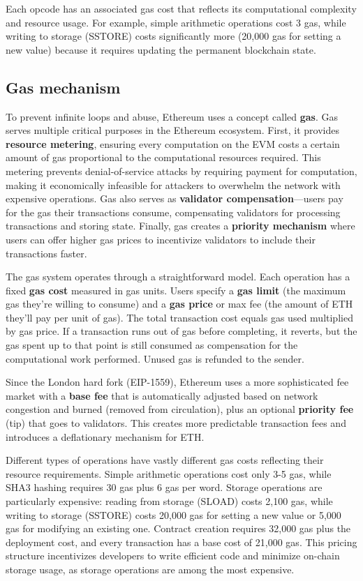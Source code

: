 Each opcode has an associated gas cost that reflects its computational complexity and resource usage. For example, simple arithmetic operations cost 3 gas, while writing to storage (SSTORE) costs significantly more (20,000 gas for setting a new value) because it requires updating the permanent blockchain state.

\subsection{Gas mechanism}
To prevent infinite loops and abuse, Ethereum uses a concept called \textbf{gas}. Gas serves multiple critical purposes in the Ethereum ecosystem. First, it provides \textbf{resource metering}, ensuring every computation on the EVM costs a certain amount of gas proportional to the computational resources required. This metering prevents denial-of-service attacks by requiring payment for computation, making it economically infeasible for attackers to overwhelm the network with expensive operations. Gas also serves as \textbf{validator compensation}—users pay for the gas their transactions consume, compensating validators for processing transactions and storing state. Finally, gas creates a \textbf{priority mechanism} where users can offer higher gas prices to incentivize validators to include their transactions faster.

The gas system operates through a straightforward model. Each operation has a fixed \textbf{gas cost} measured in gas units. Users specify a \textbf{gas limit} (the maximum gas they're willing to consume) and a \textbf{gas price} or max fee (the amount of ETH they'll pay per unit of gas). The total transaction cost equals gas used multiplied by gas price. If a transaction runs out of gas before completing, it reverts, but the gas spent up to that point is still consumed as compensation for the computational work performed. Unused gas is refunded to the sender.

Since the London hard fork (EIP-1559), Ethereum uses a more sophisticated fee market with a \textbf{base fee} that is automatically adjusted based on network congestion and burned (removed from circulation), plus an optional \textbf{priority fee} (tip) that goes to validators. This creates more predictable transaction fees and introduces a deflationary mechanism for ETH.

Different types of operations have vastly different gas costs reflecting their resource requirements. Simple arithmetic operations cost only 3-5 gas, while SHA3 hashing requires 30 gas plus 6 gas per word. Storage operations are particularly expensive: reading from storage (SLOAD) costs 2,100 gas, while writing to storage (SSTORE) costs 20,000 gas for setting a new value or 5,000 gas for modifying an existing one. Contract creation requires 32,000 gas plus the deployment cost, and every transaction has a base cost of 21,000 gas. This pricing structure incentivizes developers to write efficient code and minimize on-chain storage usage, as storage operations are among the most expensive.


